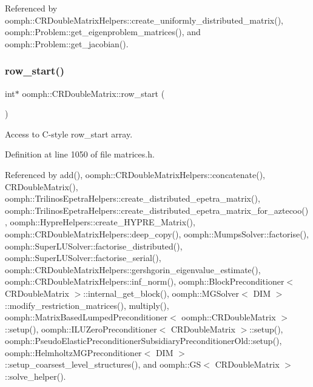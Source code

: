Referenced by oomph\+::\+C\+R\+Double\+Matrix\+Helpers\+::create\+\_\+uniformly\+\_\+distributed\+\_\+matrix(), oomph\+::\+Problem\+::get\+\_\+eigenproblem\+\_\+matrices(), and oomph\+::\+Problem\+::get\+\_\+jacobian().

\mbox{\label{classoomph_1_1CRDoubleMatrix_a25f1efd00318183abd8c65efede3f3f4}} 
\subsubsection{\texorpdfstring{row\+\_\+start()}{row\_start()}\hspace{0.1cm}{\footnotesize\ttfamily [1/2]}}
{\footnotesize\ttfamily int$\ast$ oomph\+::\+C\+R\+Double\+Matrix\+::row\+\_\+start (\begin{DoxyParamCaption}{ }\end{DoxyParamCaption})\hspace{0.3cm}{\ttfamily [inline]}}



Access to C-\/style row\+\_\+start array. 



Definition at line 1050 of file matrices.\+h.



Referenced by add(), oomph\+::\+C\+R\+Double\+Matrix\+Helpers\+::concatenate(), C\+R\+Double\+Matrix(), oomph\+::\+Trilinos\+Epetra\+Helpers\+::create\+\_\+distributed\+\_\+epetra\+\_\+matrix(), oomph\+::\+Trilinos\+Epetra\+Helpers\+::create\+\_\+distributed\+\_\+epetra\+\_\+matrix\+\_\+for\+\_\+aztecoo(), oomph\+::\+Hypre\+Helpers\+::create\+\_\+\+H\+Y\+P\+R\+E\+\_\+\+Matrix(), oomph\+::\+C\+R\+Double\+Matrix\+Helpers\+::deep\+\_\+copy(), oomph\+::\+Mumps\+Solver\+::factorise(), oomph\+::\+Super\+L\+U\+Solver\+::factorise\+\_\+distributed(), oomph\+::\+Super\+L\+U\+Solver\+::factorise\+\_\+serial(), oomph\+::\+C\+R\+Double\+Matrix\+Helpers\+::gershgorin\+\_\+eigenvalue\+\_\+estimate(), oomph\+::\+C\+R\+Double\+Matrix\+Helpers\+::inf\+\_\+norm(), oomph\+::\+Block\+Preconditioner$<$ C\+R\+Double\+Matrix $>$\+::internal\+\_\+get\+\_\+block(), oomph\+::\+M\+G\+Solver$<$ D\+I\+M $>$\+::modify\+\_\+restriction\+\_\+matrices(), multiply(), oomph\+::\+Matrix\+Based\+Lumped\+Preconditioner$<$ oomph\+::\+C\+R\+Double\+Matrix $>$\+::setup(), oomph\+::\+I\+L\+U\+Zero\+Preconditioner$<$ C\+R\+Double\+Matrix $>$\+::setup(), oomph\+::\+Pseudo\+Elastic\+Preconditioner\+Subsidiary\+Preconditioner\+Old\+::setup(), oomph\+::\+Helmholtz\+M\+G\+Preconditioner$<$ D\+I\+M $>$\+::setup\+\_\+coarsest\+\_\+level\+\_\+structures(), and oomph\+::\+G\+S$<$ C\+R\+Double\+Matrix $>$\+::solve\+\_\+helper().

